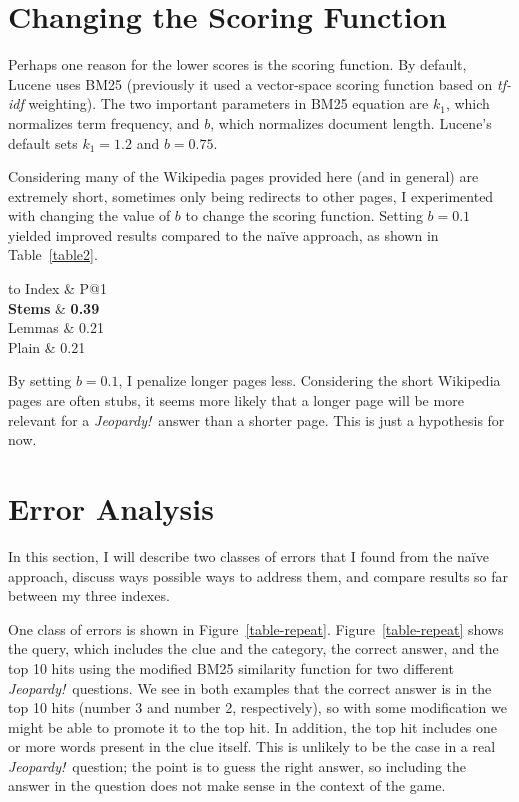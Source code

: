 \documentclass[11pt,letterpaper]{article}
\begin{document}
\section{Changing the Scoring Function}

Perhaps one reason for the lower scores is the scoring function.
By default, Lucene uses BM25 (previously it used a vector-space scoring function based on \textit{tf-idf} weighting).
The two important parameters in BM25 equation are $k_1$, which normalizes term frequency, and $b$, which normalizes document length.
Lucene's default sets $k_1 = 1.2$ and $b = 0.75$.


Considering many of the Wikipedia pages provided here (and in general) are extremely short, sometimes only being redirects to other pages, I experimented with changing the value of $b$ to change the scoring function.
Setting $b = 0.1$ yielded improved results compared to the na\"ive approach, as shown in Table~\ref{table2}.


\begin{table}[h!]
	\begin{center}
		\begin{tabu} to \textwidth {cc}\toprule
			Index & P@1 \\ \midrule
			\textbf{Stems} & \textbf{0.39} \\
			Lemmas & 0.21 \\
			Plain & 0.21 \\\bottomrule
		\end{tabu}
		\caption{Precision at 1 scores for the na\"ive model with modified BM25 scoring ($k_1=1.2$, $b=0.1$).}
		\label{table2}
	\end{center}
\end{table}


By setting $b = 0.1$, I penalize longer pages less.
Considering the short Wikipedia pages are often stubs, it seems more likely that a longer page will be more relevant for a \textit{Jeopardy!}~answer than a shorter page.
This is just a hypothesis for now.


\section{Error Analysis}

In this section, I will describe two classes of errors that I found from the na\"ive approach, discuss ways possible ways to address them, and compare results so far between my three indexes.

One class of errors is shown in Figure~\ref{table-repeat}. Figure~\ref{table-repeat} shows the query, which includes the clue and the category, the correct answer, and the top 10 hits using the modified BM25 similarity function for two different \textit{Jeopardy!}~questions.
We see in both examples that the correct answer is in the top 10 hits (number 3 and number 2, respectively), so with some modification we might be able to promote it to the top hit.
In addition, the top hit includes one or more words present in the clue itself.
This is unlikely to be the case in a real \textit{Jeopardy!}~question; the point is to guess the right answer, so including the answer in the question does not make sense in the context of the game.
\end{document}
